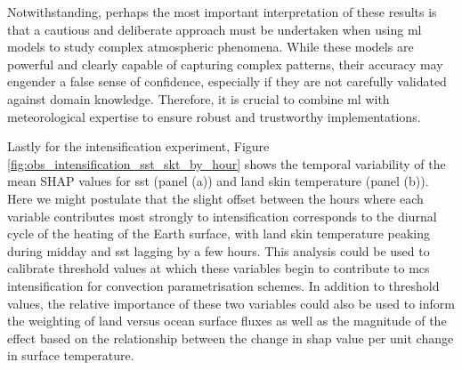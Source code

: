Notwithstanding, perhaps the most important interpretation of these results is that a cautious and deliberate approach must be undertaken when using \acrshort{ml} models to study complex atmospheric phenomena. While these models are powerful and clearly capable of capturing complex patterns, their accuracy may engender a false sense of confidence, especially if they are not carefully validated against domain knowledge. Therefore, it is crucial to combine \acrshort{ml} with meteorological expertise to ensure robust and trustworthy implementations.

Lastly for the intensification experiment, Figure \ref{fig:obs_intensification_sst_skt_by_hour} shows the temporal variability of the mean SHAP values for \acrfull{sst} (panel (a)) and land skin temperature (panel (b)). Here we might postulate that the slight offset between the hours where each variable contributes most strongly to intensification corresponds to the diurnal cycle of the heating of the Earth surface, with land skin temperature peaking during midday and \acrshort{sst} lagging by a few hours. This analysis could be used to calibrate threshold values at which these variables begin to contribute to \acrshort{mcs} intensification for convection parametrisation schemes. In addition to threshold values, the relative importance of these two variables could also be used to inform the weighting of land versus ocean surface fluxes as well as the magnitude of the effect based on the relationship between the change in \acrshort{shap} value per unit change in surface temperature.

